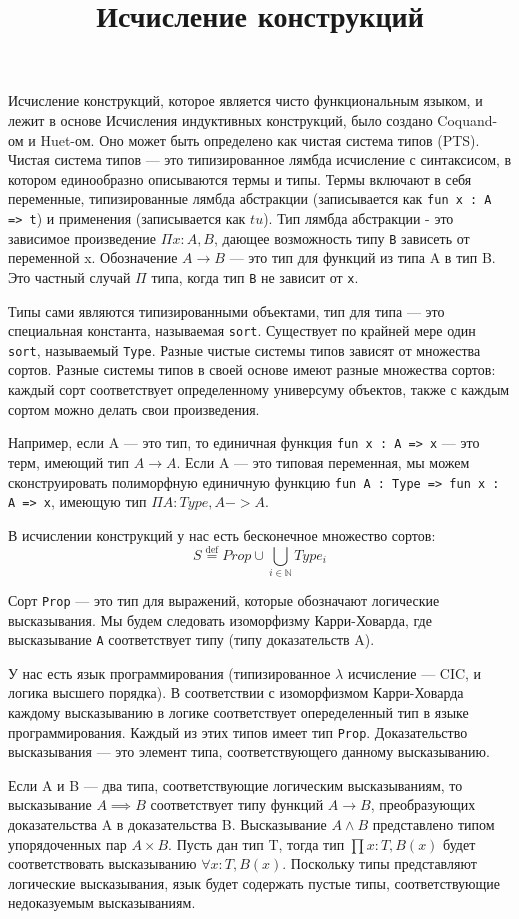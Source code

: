 \documentclass[12pt]{article}
\title{Исчисление конструкций}
\begin{document}
Исчисление конструкций, которое является чисто функциональным языком, и лежит в основе Исчисления индуктивных конструкций, было создано Coquand-ом и Huet-ом. Оно может быть определено как чистая система типов (PTS). Чистая система типов --- это типизированное лямбда исчисление с синтаксисом, в котором единообразно описываются термы и типы. Термы включают в себя переменные, типизированные лямбда абстракции (записывается как \texttt{fun x : A => t}) и применения (записывается как $t u$). Тип лямбда абстракции - это зависимое произведение $\Pi x : A, B$, дающее возможность типу \texttt{B} зависеть от переменной x. Обозначение $A \rightarrow B$ --- это тип для функций из типа A в тип B. Это частный случай $\Pi$ типа, когда тип \texttt{B} не зависит от \texttt{x}.

Типы сами являются типизированными объектами, тип для типа --- это специальная константа, называемая {\tt sort}. Существует по крайней мере один {\tt sort}, называемый {\tt Type}. Разные чистые системы типов зависят от множества сортов. Разные системы типов в своей основе имеют разные множества сортов: каждый сорт соответствует определенному универсуму объектов, также с каждым сортом можно делать свои произведения.

Например, если A --- это тип, то единичная функция \texttt{fun x : A => x} --- это терм, имеющий тип $A \rightarrow A$. Если A --- это типовая переменная, мы можем сконструировать полиморфную единичную функцию {\tt fun A : Type => fun x : A => x}, имеющую тип $\Pi A : Type, A -> A$.

В исчислении конструкций у нас есть бесконечное множество сортов:
$$
S \stackrel{\text{def}}{=} {Prop} \cup \bigcup_{i \in \mathbb{N}} {Type_i}
$$

Сорт {\tt Prop} --- это тип для выражений, которые обозначают логические высказывания. Мы будем следовать изоморфизму Карри-Ховарда, где высказывание {\tt A} соответствует типу (типу доказательств A).

У нас есть язык программирования (типизированное $\lambda$ исчисление --- CIC, и логика высшего порядка). В соответствии с изоморфизмом Карри-Ховарда каждому высказыванию в логике соответствует опеределенный тип в языке программирования. Каждый из этих типов имеет тип {\tt Prop}. Доказательство высказывания --- это элемент типа, соответствующего данному высказыванию.

Если A и B --- два типа, соответствующие логическим высказываниям, то высказывание $A \implies B$ соответствует типу функций $A \rightarrow B$, преобразующих доказательства A в доказательства B. Высказывание $A \land B$ представлено типом упорядоченных пар $A \times B$. Пусть дан тип T, тогда тип $\prod x : T, B(x)$ будет соответствовать высказыванию $\forall x : T, B(x)$. Поскольку типы представляют логические высказывания, язык будет содержать пустые типы, соответствующие недоказуемым высказываниям.
\end{document}
